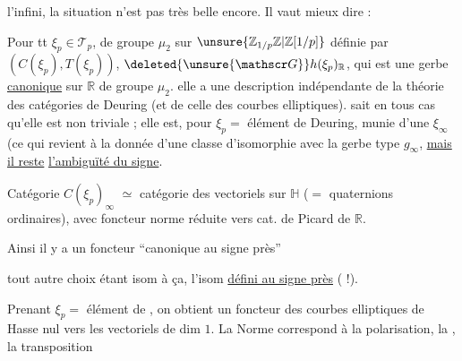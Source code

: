 
 l'infini, la situation n'est pas très belle encore. Il
vaut mieux dire :

Pour tt $\xi_p\in\mathcal T_p$,   de
groupe $\mu_2$ sur $\unsure{\mathbb Z_{1/p}\mathbb Z|\mathbb Z[1/p]}$ définie par $(C(\xi_p),T(\xi_p))$,  
$\deleted{\unsure{\mathscr G}} h(\xi_p)_{\mathbb R}$, qui est une gerbe \uline{canonique} sur $\mathbb R$ de groupe
$\mu_2$.   elle a une description indépendante
de la théorie des catégories de Deuring (et de celle
des courbes elliptiques).  sait en tous cas
qu'elle est non triviale ; elle est, pour $\xi_p=$ élément de Deuring,
munie d'une  $\xi_\infty$ (ce qui revient à la
donnée d'une classe d'isomorphie  avec la gerbe
type $g_\infty$, \uline{mais il reste} \uline{l'ambiguïté du signe}.

Catégorie $C(\xi_p)_\infty$  $\simeq$ catégorie des vectoriels   sur
$\mathbb H$ ($=$ quaternions ordinaires), avec
 foncteur norme
réduite vers cat. de Picard de $\mathbb R$.

Ainsi il y a un foncteur ``canonique au signe près''



tout autre choix étant isom
à ça, l'isom \uline{défini au signe près} ( !).

Prenant $\xi_p=$ élément de , on obtient un
foncteur  des courbes elliptiques de Hasse nul
vers les vectoriels  de dim $1$. La  Norme
correspond à la polarisation, la , la transposition
